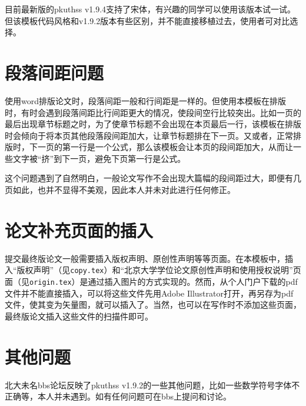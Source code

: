 目前最新版的pkuthss v1.9.4支持了宋体，有兴趣的同学可以使用该版本试一试。但该模板代码风格和v1.9.2版本有些区别，并不能直接移植过去，使用者可对比选择。

\section{段落间距问题}

使用word排版论文时，段落间距一般和行间距是一样的。但使用本模板在排版时，有时会遇到段落间距比行间距更大的情况，使段间空行比较突出。比如一页的最后出现章节标题之时，为了使章节标题不会出现在本页最后一行，该模板在排版时会倾向于将本页其他段落段间距加大，让章节标题排在下一页。又或者，正常排版时，下一页的第一行是一个公式，那么该模板会让本页的段间距加大，从而让一些文字被“挤”到下一页，避免下页第一行是公式。

这个问题遇到了自然明白，一般论文写作不会出现大篇幅的段间距过大，即便有几页如此，也并不显得不美观，因此本人并未对此进行任何修正。

\section{论文补充页面的插入}

提交最终版论文一般需要插入版权声明、原创性声明等等页面。在本模板中，插入“版权声明”（见\texttt{copy.tex}）和“北京大学学位论文原创性声明和使用授权说明”页面（见\texttt{origin.tex}）是通过插入图片的方式实现的。然而，从个人门户下载的pdf文件并不能直接插入，可以将这些文件先用Adobe Illustrator打开，再另存为pdf文件，使其变为矢量图，就可以插入了。当然，也可以在写作时不添加这些页面，最终版论文插入这些文件的扫描件即可。

\section{其他问题}

北大未名bbs论坛反映了pkuthss v1.9.2的一些其他问题，比如一些数学符号字体不正确等，本人并未遇到。如有任何问题可在bbs上提问和讨论。